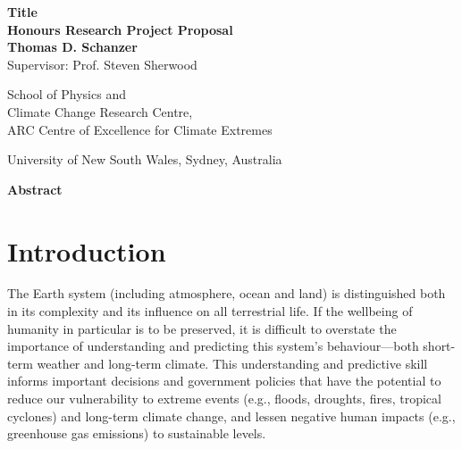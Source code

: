 \documentclass[titlepage]{article}
\begin{document}
\begin{titlepage}
\begin{center}
    {\Huge \textbf{%
        Title
    }} \\
    \vspace{0.75cm}
    {\Large\textbf{Honours Research Project Proposal}} \\
    \vspace{0.75cm}
    {\Large\textbf{Thomas D. Schanzer}} \\
    \vspace{6pt}
    {\large Supervisor: Prof. Steven Sherwood} \\
    \vspace{0.75cm}
    {\large%
        School of Physics and \\
        Climate Change Research Centre,\\
        ARC Centre of Excellence for Climate Extremes

        University of New South Wales, Sydney, Australia
    }
\end{center}
\vspace{1cm}
\begin{center}
{\large\textbf{Abstract}}

\begin{minipage}{13cm}
    \lipsum[1]
\end{minipage}
\end{center}
\vspace{1cm}
\tableofcontents
\end{titlepage}

\newpage
\pagestyle{fancy}
\thispagestyle{fancy}
\section{Introduction}
The Earth system (including atmosphere, ocean and land) is distinguished both
in its complexity and its influence on all terrestrial life. If the wellbeing
of humanity in particular is to be preserved, it is difficult to overstate the
importance of understanding and predicting this system's behaviour---both
short-term weather and long-term climate. This understanding and predictive
skill informs important decisions and government policies that have the
potential to reduce our vulnerability to extreme events (e.g., floods,
droughts, fires, tropical cyclones) and long-term climate change, and lessen
negative human impacts (e.g., greenhouse gas emissions) to sustainable levels.
\end{document}
